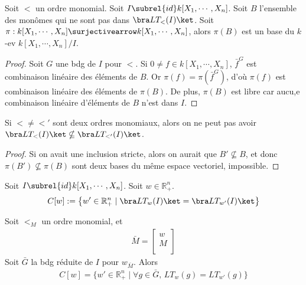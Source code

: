         \begin{prop}
            Soit $<$ un ordre monomial. Soit $I \subrel{id} k[X_1, \cdots, X_n]$. Soit $B$ l'ensemble des monômes qui ne sont pas dans $\bra LT_<(I) \ket$. Soit $\pi : k[X_1, \cdots, X_n] \surjectivearrow k[X_1, \cdots, X_n]$, alors $\pi(B)$ est un base du $k$-ev $k[X_1, \cdots, X_n]/I$.
        \end{prop}
        \begin{proof}
            Soit $G$ une bdg de $I$ pour $<$. Si $0 \neq f \in k[X_1, \cdots, X_n]$, $\bar f^G$ est combinaison linéaire des éléments de $B$. Or $\pi(f) = \pi(\bar f^G)$, d'où $\pi(f)$ est combinaison linéaire des éléments de $\pi(B)$. De plus, $\pi(B)$ est libre car aucu,e combinaison linéaire d'éléments de $B$ n'est dans $I$.
        \end{proof}
        \begin{coro}
            Si $< \neq <'$ sont deux ordres monomiaux, alors on ne peut pas avoir $\bra LT_<(I) \ket \nsubseteq \bra LT_{<'}(I) \ket$.
        \end{coro}
        \begin{proof}
            Si on avait une inclusion stricte, alors on aurait que $B' \nsubseteq B$, et donc $\pi(B') \nsubseteq \pi(B)$ sont deux bases du même espace vectoriel, impossible.
        \end{proof}
        \begin{defi}
            Soit $I \subrel{id} k[X_1, \cdots, X_n]$. Soit $w \in \mathbb{R}_+^n$.
            \begin{align}
                C[w] := \left\{ w' \in \mathbb{R}_+^n \mid \bra LT_w(I) \ket = \bra LT_{w'}(I) \ket \right\}
            \end{align}
        \end{defi}
        \begin{prop}
            Soit $<_M$ un ordre monomial, et
            \begin{align*}
                \bar M =
                \begin{bmatrix}
                    w \\
                    M \\
                \end{bmatrix}
            \end{align*}
            Soit $\bar G$ la bdg réduite de $I$ pour $w_{\bar M}$. Alors
            \begin{align*}
                C[w] = \{w' \in \mathbb{R}_+^n \mid \forall g \in \bar G,\, LT_w(g) = LT_{w'}(g) \}
            \end{align*}
        \end{prop}
